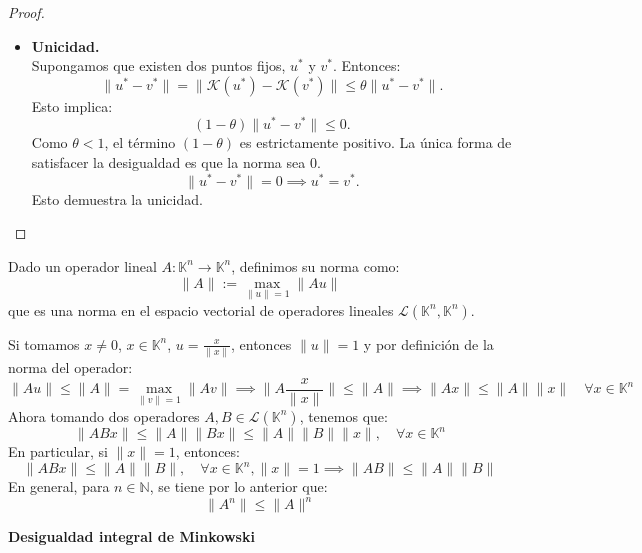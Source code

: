 \begin{proof}
\begin{itemize}
        Tomando límites en la relación de recurrencia $u_{n+1} = \mathcal{K}(u_n)$:
        \[
            u^{*} = \lim_{n \to \infty} u_{n+1} = \lim_{n \to \infty} \mathcal{K}(u_n) = \mathcal{K}\left( \lim_{n \to \infty} u_n \right) = \mathcal{K}(u^{*}).
        \]
        Por tanto, $u^{*}$ es un punto fijo.

        \item \textbf{Unicidad.}\\
        Supongamos que existen dos puntos fijos, $u^{*}$ y $v^{*}$. Entonces:
        \[
            \| u^{*} - v^{*} \| = \| \mathcal{K}(u^{*}) - \mathcal{K}(v^{*}) \| \leq \theta \| u^{*} - v^{*} \|.
        \]
        Esto implica:
        \[
            (1 - \theta) \| u^{*} - v^{*} \| \leq 0.
        \]
        Como $\theta < 1$, el término $(1-\theta)$ es estrictamente positivo. La única forma de satisfacer la desigualdad es que la norma sea $0$.
        \[
            \| u^{*} - v^{*} \| = 0 \implies u^{*} = v^{*}.
        \]
        Esto demuestra la unicidad.        
    \end{itemize}
\end{proof}


\begin{definición} 
    Dado un operador lineal $A : \mathbb{K}^n \to \mathbb{K}^n$, definimos su norma como:
    \[
        \| A \| := \max_{\| u \| = 1} \| A u \|
    \]
    que es una norma en el espacio vectorial de operadores lineales $\mathcal{L}(\mathbb{K}^n, \mathbb{K}^n)$.
\end{definición}

Si tomamos $x \neq 0$, $x \in \mathbb{K}^n$, $u = \frac{x}{\| x \|}$, entonces $\| u \| = 1$ y por definición de la norma del operador:
\[
    \| A u \| \leq \| A \| = \max_{\| v \| = 1} \| A v \| \implies \| A \frac{x}{\| x \|} \| \leq \| A \| \implies \| A x \| \leq \| A \| \| x \| \quad \forall x \in \mathbb{K}^n 
\]
Ahora tomando dos operadores $A, B \in \mathcal{L}(\mathbb{K}^n)$, tenemos que:
\[
    \| A B x \| \leq \| A \| \| B x \| \leq \| A \| \| B \| \| x \|, \quad \forall x \in \mathbb{K}^n
\]
En particular, si $\| x \| = 1$, entonces:
\[
    \| A B x \| \leq \| A \| \| B \|, \quad \forall x \in \mathbb{K}^n, \| x \| = 1 \implies \| A B \| \leq \| A \| \| B \|
\]
En general, para $n \in \mathbb{N}$, se tiene por lo anterior que:
\[
    \| A^n \| \leq \| A \|^n
\]

\textbf{Desigualdad integral de Minkowski}\\


